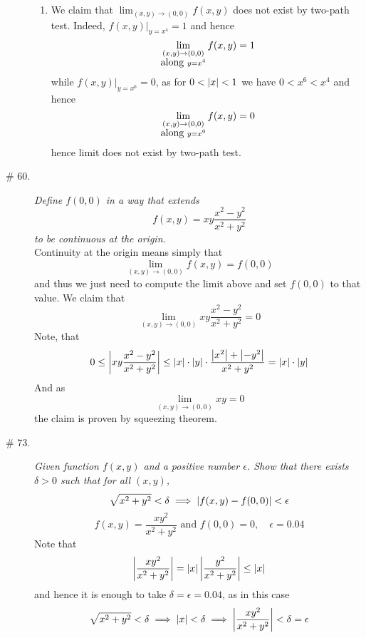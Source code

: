 \documentclass[8pt]{article} %
\begin{document}
\begin{description}
{\begin{enumerate}[label=\bfseries\alph*.]
				hence \[x^4>\frac{81}{16}>\frac{7}{2}>y>0\]
				and thus $\myabs{f(x,y)-0}=\myabs{0-0}=0<\epsilon$.
			\item We claim that $\lim_{(x,y)\to(0,0)}f(x,y)$ does not exist by two-path test. Indeed, 
				$f(x,y)\bigg|_{y=x^4}=1$ and hence 
				\[\lim_{\begin{subarray}{c}(x,y)\to(0,0)\\\mbox{along }y=x^4\end{subarray}}f(x,y)=1\]
					while $f(x,y)\bigg|_{y=x^6}=0$, as for $0<\left|x\right|<1$ we have $0<x^6<x^4$ and hence
				\[\lim_{\begin{subarray}{c}(x,y)\to(0,0)\\\mbox{along }y=x^6\end{subarray}}f(x,y)=0\]
				hence limit does not exist by two-path test.
		\end{enumerate}
		}
	\item[\# 60.]{{\it Define $f(0,0)$ in a way that extends \[f(x,y)=xy\frac{x^2-y^2}{x^2+y^2}\] to be continuous at the origin.}
		\\Continuity at the origin means simply that \[\lim_{(x,y)\to(0,0)}f(x,y)=f(0,0)\] and thus we just need to compute
		the limit above and set $f(0,0)$ to that value. We claim that \[\lim_{(x,y)\to(0,0)}xy\frac{x^2-y^2}{x^2+y^2}=0\]
		Note, that
		\[0\leq
		\left|xy\frac{x^2-y^2}{x^2+y^2}\right|\leq\left|x\right|\cdot\left|y\right|\cdot\frac{\left|x^2\right|+\left|-y^2\right|}{x^2+y^2}=\left|x\right|
		\cdot\left|y\right|\]
		And as \[\lim_{(x,y)\to(0,0)}xy=0\]
		the claim is proven by squeezing theorem.
	}
	\item[\# 73.]{{\it Given function $f(x,y)$ and a positive number $\epsilon$. Show that there exists $\delta>0$ such that
		for all $(x,y)$,\[\sqrt{x^2+y^2}<\delta\implies\left|f(x,y)-f(0,0)\right|<\epsilon\]}
		\[f(x,y)=\frac{xy^2}{x^2+y^2}\mbox{ and }f(0,0)=0,\quad\epsilon=0.04\]
		Note that
		\[\left|\frac{xy^2}{x^2+y^2}\right|=\left|x\right|\left|\frac{y^2}{x^2+y^2}\right|\leq\left|x\right|\]
		and hence it is enough to take $\delta=\epsilon=0.04$, as in this case
		\[\sqrt{x^2+y^2}<\delta\implies\left|x\right|<\delta\implies\left|\frac{xy^2}{x^2+y^2}\right|<\delta=\epsilon\]
		}

\end{description}
\end{document}
